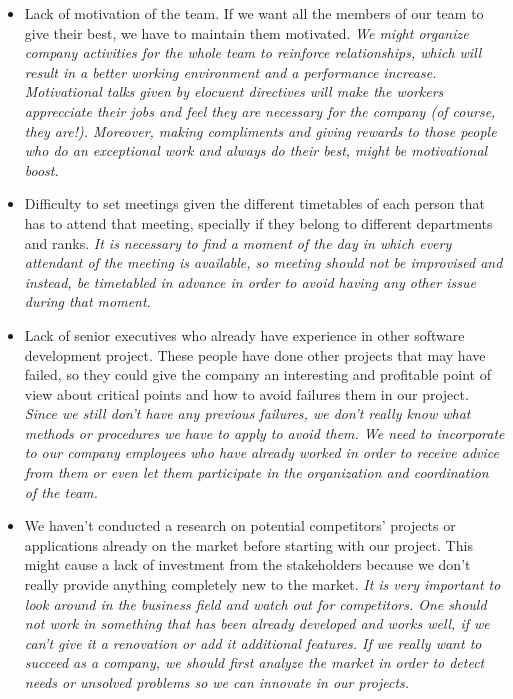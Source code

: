 \documentclass{article}
\begin{document}
\begin{itemize}
	\item Lack of motivation of the team. If we want all the members of our team to give their best, we have to maintain them motivated. \textit{We might organize company activities for the whole team to reinforce relationships, which will result in a better working environment and a performance increase. Motivational talks given by elocuent directives will make the workers apprecciate their jobs and feel they are necessary for the company (of course, they are!). Moreover, making compliments and giving rewards to those people who do an exceptional work and always do their best, might be motivational boost.}

	\item Difficulty to set meetings given the different timetables of each person that has to attend that meeting, specially if they belong to different departments and ranks. \textit{It is necessary to find a moment of the day in which every attendant of the meeting is available, so meeting should not be improvised and instead, be timetabled in advance in order to avoid having any other issue during that moment.}

	\item Lack of senior executives who already have experience in other software development project. These people have done other projects that may have failed, so they could give the company an interesting and profitable point of view about critical points and how to avoid failures them in our project. \textit{Since we still don't have any previous failures, we don't really know what methods or procedures we have to apply to avoid them. We need to incorporate to our company employees who have already worked in order to receive advice from them or even let them participate in the organization and coordination of the team.}

	\item We haven't conducted a research on potential competitors' projects or applications already on the market before starting with our project. This might cause a lack of investment from the stakeholders because we don't really provide anything completely new to the market. \textit{It is very important to look around in the business field and watch out for competitors. One should not work in something that has been already developed and works well, if we can't give it a renovation or add it additional features. If we really want to succeed as a company, we should first analyze the market in order to detect needs or unsolved problems so we can innovate in our projects.}


\end{itemize}
\end{document}
